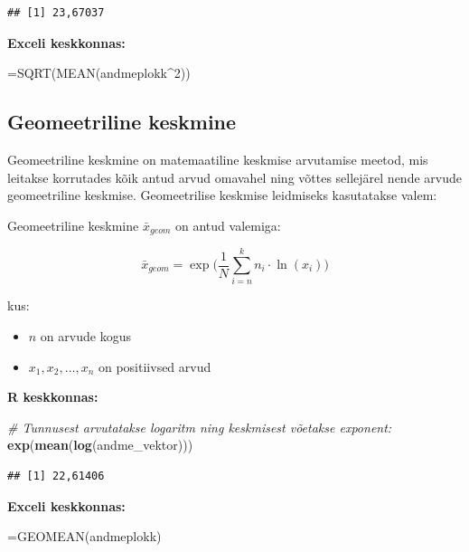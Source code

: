 \documentclass[
]{book}
\newenvironment{Shaded}{\begin{snugshade}}{\end{snugshade}}
\newcommand{\CommentTok}[1]{\textcolor[rgb]{0.56,0.35,0.01}{\textit{#1}}}
\newcommand{\FunctionTok}[1]{\textcolor[rgb]{0.13,0.29,0.53}{\textbf{#1}}}
\newcommand{\NormalTok}[1]{#1}
\providecommand{\tightlist}{%
  \setlength{\itemsep}{0pt}\setlength{\parskip}{0pt}}
\renewenvironment{Shaded} {\begin{snugshade}\footnotesize} {\end{snugshade}}
\begin{document}
\begin{verbatim}
## [1] 23,67037
\end{verbatim}

\textbf{Exceli keskkonnas:}

\begin{Shaded}
\begin{Highlighting}[]
\NormalTok{=SQRT(MEAN(andmeplokk\^{}2))}
\end{Highlighting}
\end{Shaded}

\subsection{Geomeetriline keskmine}\label{geomeetriline-keskmine}

Geomeetriline keskmine on matemaatiline keskmise arvutamise meetod, mis leitakse korrutades kõik antud arvud omavahel ning võttes sellejärel nende arvude geomeetriline keskmise. Geomeetrilise keskmise leidmiseks kasutatakse valem:

Geomeetriline keskmine \(\bar x_{geom}\) on antud valemiga:

\[\bar x_{geom}=\exp \biggl( \frac{1}{N}\sum_{i=n}^k n_i \cdot \ln(x_i) \biggr) \]

kus:

\begin{itemize}
\tightlist
\item
  \(n\) on arvude kogus
\item
  \(x_1, x_2, \ldots, x_n\) on positiivsed arvud
\end{itemize}

\textbf{R keskkonnas:}

\begin{Shaded}
\begin{Highlighting}[]
\CommentTok{\# Tunnusest arvutatakse logaritm ning keskmisest võetakse exponent:}
\FunctionTok{exp}\NormalTok{(}\FunctionTok{mean}\NormalTok{(}\FunctionTok{log}\NormalTok{(andme\_vektor)))}
\end{Highlighting}
\end{Shaded}

\begin{verbatim}
## [1] 22,61406
\end{verbatim}

\textbf{Exceli keskkonnas:}

\begin{Shaded}
\begin{Highlighting}[]
\NormalTok{=GEOMEAN(andmeplokk)}
\end{Highlighting}
\end{Shaded}
\end{document}
